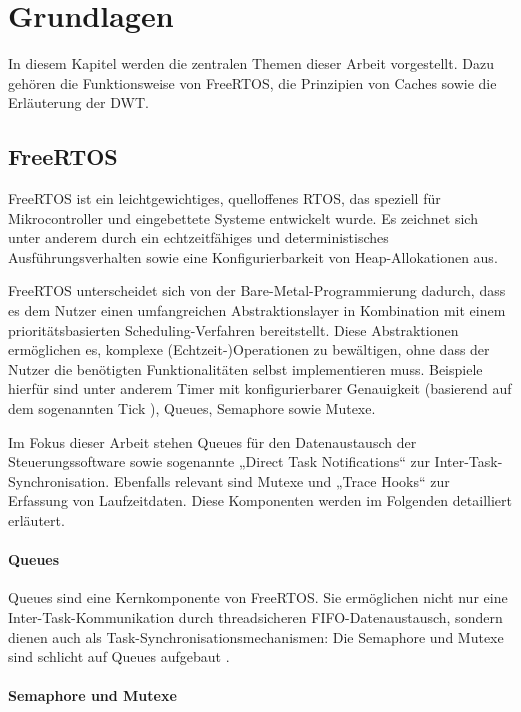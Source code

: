 \section{Grundlagen}

In diesem Kapitel werden die zentralen Themen dieser Arbeit vorgestellt. Dazu
gehören die Funktionsweise von FreeRTOS, die Prinzipien von Caches sowie die
Erläuterung der \ac{DWT}.

\subsection{FreeRTOS}

FreeRTOS ist ein leichtgewichtiges, quelloffenes RTOS, das speziell für
Mikrocontroller und eingebettete Systeme entwickelt wurde. Es zeichnet sich
unter anderem durch ein echtzeitfähiges \cite{freertos_tutorial} und
deterministisches Ausführungsverhalten sowie eine Konfigurierbarkeit von
Heap-Allokationen aus.

FreeRTOS unterscheidet sich von der Bare-Metal-Programmierung dadurch, dass es
dem Nutzer einen umfangreichen Abstraktionslayer in Kombination mit einem
prioritätsbasierten Scheduling-Verfahren bereitstellt. Diese Abstraktionen
ermöglichen es, komplexe (Echtzeit-)Operationen zu bewältigen, ohne dass der
Nutzer die benötigten Funktionalitäten selbst implementieren muss. Beispiele
hierfür sind unter anderem Timer mit konfigurierbarer Genauigkeit (basierend auf
dem sogenannten Tick \cite{freertos_rtos_tick}), Queues, Semaphore sowie Mutexe.

Im Fokus dieser Arbeit stehen Queues für den Datenaustausch der
Steuerungssoftware sowie sogenannte „Direct Task Notifications“ zur
Inter-Task-Synchronisation. Ebenfalls relevant sind Mutexe und „Trace Hooks“ zur
Erfassung von Laufzeitdaten. Diese Komponenten werden im Folgenden detailliert
erläutert.

\paragraph{Queues}

Queues sind eine Kernkomponente von FreeRTOS. Sie ermöglichen nicht nur eine
Inter-Task-Kommunikation durch threadsicheren FIFO-Datenaustausch, sondern
dienen auch als Task-Synchronisationsmechanismen: Die Semaphore und Mutexe sind
schlicht auf Queues aufgebaut \cite{freertos_semphr_incl, freertos_queue_mtx}.

\paragraph{Semaphore und Mutexe} \label{sec:mutex}

